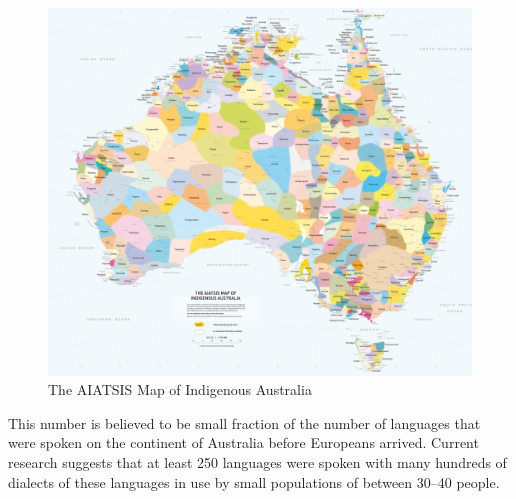 \begin{figure}[ht]
\centering
\includegraphics[scale=0.15]{figures/HortonLanguageMap.png}
\caption{The AIATSIS Map of Indigenous Australia\cite{RefWorks:427}}
\end{figure}

This number is believed to be small fraction of the number of languages that were spoken on the continent of Australia before Europeans arrived. Current research suggests that at least 250 languages were spoken with many hundreds of dialects of these languages in use by small populations of between 30--40 people.\cite{RefWorks:455}

